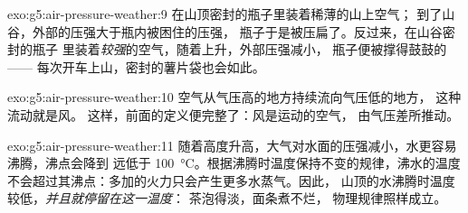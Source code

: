 \begin{solution}{exo:g5:air-pressure-weather:9}
在山顶密封的瓶子里装着稀薄的山上空气；
到了山谷，外部的压强大于瓶内被困住的压强，
瓶子于是被压扁了。反过来，在山谷密封的瓶子
里装着\emph{较强}的空气，随着上升，外部压强减小，
瓶子便被撑得鼓鼓的——
每次开车上山，密封的薯片袋也会如此。
\end{solution}

\begin{solution}{exo:g5:air-pressure-weather:10}
空气从气压高的地方持续流向气压低的地方，
这种流动就是风。
这样，前面的定义便完整了：风是运动的空气，
由气压差所推动。
\end{solution}

\begin{solution}{exo:g5:air-pressure-weather:11}
随着高度升高，大气对水面的压强减小，水更容易沸腾，沸点会降到
远低于 \qty{100}{\celsius}。根据沸腾时温度保持不变的规律，沸水的温度
不会超过其沸点：多加的火力只会产生更多水蒸气。因此，
山顶的水沸腾时温度较低，\emph{并且就停留在这一温度}：
茶泡得淡，面条煮不烂，
物理规律照样成立。
\end{solution}
